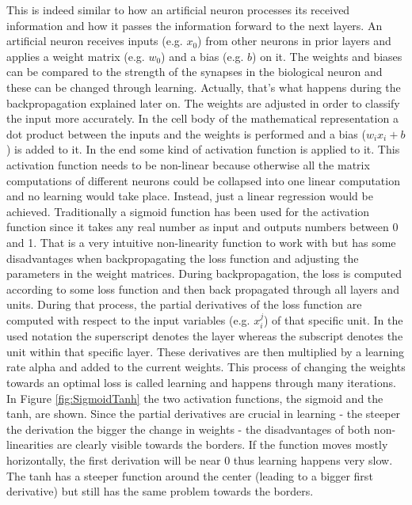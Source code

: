 This is indeed similar to how an artificial neuron processes its received information and how it passes the information forward to the next layers. An artificial neuron receives inputs (e.g. $x_0$) from other neurons in prior layers and applies a weight matrix (e.g. $w_0$) and a bias (e.g. $b$) on it. The weights and biases can be compared to the strength of the synapses in the biological neuron and these can be changed through learning. Actually, that's what happens during the backpropagation explained later on. The weights are adjusted in order to classify the input more accurately. In the cell body of the mathematical representation a dot product between the inputs and the weights is performed and a bias ($w_i x_i + b$) is added to it. In the end some kind of activation function is applied to it. This activation function needs to be non-linear because otherwise all the matrix computations of different neurons could be collapsed into one linear computation and no learning would take place. Instead, just a linear regression would be achieved.
Traditionally a sigmoid function has been used for the activation function since it takes any real number as input and outputs numbers between 0 and 1. That is a very intuitive non-linearity function to work with but has some disadvantages when backpropagating the loss function and adjusting the parameters in the weight matrices.  During backpropagation, the loss is computed according to some loss function and then back propagated through all layers and units. During that process, the partial derivatives of the loss function are computed with respect to the input variables (e.g. $x_i^j$) of that specific unit. In the used notation the superscript denotes the layer whereas the subscript denotes the unit within that specific layer. These derivatives are then multiplied by a learning rate alpha and added to the current weights. This process of changing the weights towards an optimal loss is called learning and happens through many iterations. In Figure \ref{fig:SigmoidTanh} the two activation functions, the sigmoid and the tanh, are shown. Since the partial derivatives are crucial in learning - the steeper the derivation the bigger the change in weights - the disadvantages of both non-linearities are clearly visible towards the borders. If the function moves mostly horizontally, the first derivation will be near 0 thus learning happens very slow. The tanh has a steeper function around the center (leading to a bigger first derivative) but still has the same problem towards the borders.

